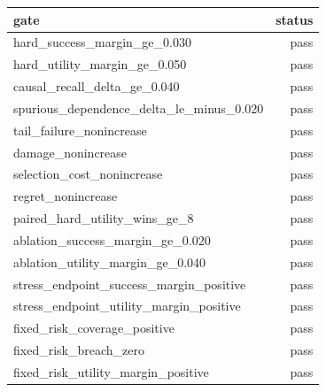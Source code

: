\begin{tabular}{lr}
\toprule
gate & status \\
\midrule
hard\_success\_margin\_ge\_0.030 & pass \\
hard\_utility\_margin\_ge\_0.050 & pass \\
causal\_recall\_delta\_ge\_0.040 & pass \\
spurious\_dependence\_delta\_le\_minus\_0.020 & pass \\
tail\_failure\_nonincrease & pass \\
damage\_nonincrease & pass \\
selection\_cost\_nonincrease & pass \\
regret\_nonincrease & pass \\
paired\_hard\_utility\_wins\_ge\_8 & pass \\
ablation\_success\_margin\_ge\_0.020 & pass \\
ablation\_utility\_margin\_ge\_0.040 & pass \\
stress\_endpoint\_success\_margin\_positive & pass \\
stress\_endpoint\_utility\_margin\_positive & pass \\
fixed\_risk\_coverage\_positive & pass \\
fixed\_risk\_breach\_zero & pass \\
fixed\_risk\_utility\_margin\_positive & pass \\
\bottomrule
\end{tabular}
